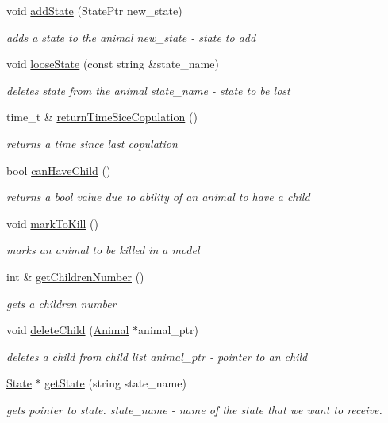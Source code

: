 \begin{DoxyCompactItemize}
void \hyperlink{class_animal_a2be4b1b1d143492670ee7f22c55f3090}{add\+State} (State\+Ptr new\+\_\+state)
\begin{DoxyCompactList}\small\item\em adds a state to the animal  new\+\_\+state -\/ state to add \end{DoxyCompactList}\item 
void \hyperlink{class_animal_aa8cb8cb6c83b686d8076115c2dc1d5de}{loose\+State} (const string \&state\+\_\+name)
\begin{DoxyCompactList}\small\item\em deletes state from the animal  state\+\_\+name -\/ state to be lost \end{DoxyCompactList}\item 
time\+\_\+t \& \hyperlink{class_animal_aadf3c770f5b4795704d20e4e779db60e}{return\+Time\+Sice\+Copulation} ()
\begin{DoxyCompactList}\small\item\em returns a time since last copulation \end{DoxyCompactList}\item 
bool \hyperlink{class_animal_a79e7309613ba6206cd669f8bb6dfea68}{can\+Have\+Child} ()
\begin{DoxyCompactList}\small\item\em returns a bool value due to ability of an animal to have a child \end{DoxyCompactList}\item 
void \hyperlink{class_animal_a4843dae3d10111748918c52ef4ff0d18}{mark\+To\+Kill} ()
\begin{DoxyCompactList}\small\item\em marks an animal to be killed in a model \end{DoxyCompactList}\item 
int \& \hyperlink{class_animal_a0d801911499ea1f1fd9c35370f796bb6}{get\+Children\+Number} ()
\begin{DoxyCompactList}\small\item\em gets a children number \end{DoxyCompactList}\item 
void \hyperlink{class_animal_a159dffe71ed72c6229b17c6e360ca6a1}{delete\+Child} (\hyperlink{class_animal}{Animal} $\ast$animal\+\_\+ptr)
\begin{DoxyCompactList}\small\item\em deletes a child from child list  animal\+\_\+ptr -\/ pointer to an child \end{DoxyCompactList}\item 
\hyperlink{class_state}{State} $\ast$ \hyperlink{class_animal_a18d4928a07297d4611e3a4e4197c3a8b}{get\+State} (string state\+\_\+name)
\begin{DoxyCompactList}\small\item\em gets pointer to state.  state\+\_\+name -\/ name of the state that we want to receive. \end{DoxyCompactList}\end{DoxyCompactItemize}
